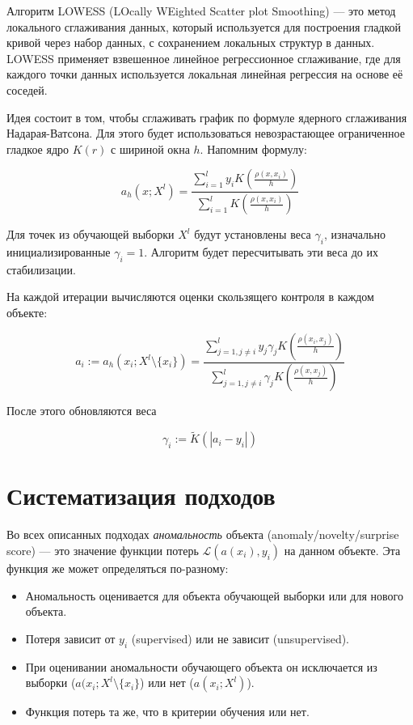 Алгоритм LOWESS (LOcally WEighted Scatter plot Smoothing) — это метод локального сглаживания данных, который используется для построения гладкой кривой через набор данных, с сохранением локальных структур в данных. LOWESS применяет взвешенное линейное регрессионное сглаживание, где для каждого точки данных используется локальная линейная регрессия на основе её соседей.

Идея состоит в том, чтобы сглаживать график по формуле ядерного сглаживания Надарая-Ватсона. Для этого будет использоваться невозрастающее ограниченное гладкое ядро $K(r)$ с шириной окна $h$. Напомним формулу:

$$a_h(x; X^l) = \frac{\sum_{i=1}^ly_i K(\frac{\rho(x, x_i)}{h})}{\sum_{i=1}^l K(\frac{\rho(x, x_i)}{h})}$$

Для точек из обучающей выборки $X^l$ будут установлены веса $\gamma_i$, изначально инициализированные $\gamma_i=1$. Алгоритм будет пересчитывать эти веса до их стабилизации.

На каждой итерации вычисляются оценки скользящего контроля в каждом объекте:

$$a_i := a_h(x_i;X^l\setminus \{x_i\}) = \frac{\sum_{j=1, j \neq i}^l y_j \gamma_j K(\frac{\rho(x_i, x_j)}{h})}{\sum_{j=1, j \neq i}^l \gamma_j K(\frac{\rho(x, x_j)}{h})}$$

После этого обновляются веса

$$\gamma_i := \tilde{K}(|a_i - y_i|)$$

\section{Систематизация подходов}

Во всех описанных подходах \textit{аномальность} объекта (anomaly/novelty/surprise score) --- это значение функции потерь $\mathcal{L}(a(x_i), y_i)$ на данном объекте. Эта функция же может определяться по-разному:

\begin{itemize}
    \item Аномальность оценивается для объекта обучающей выборки или для нового объекта.
    \item Потеря зависит от $y_i$ (supervised) или не зависит (unsupervised).
    \item При оценивании аномальности обучающего объекта он исключается из выборки ($a(x_i;X^l \setminus \{x_i\}$)  или нет ($a(x_i;X^l)$).
    \item Функция потерь та же, что в критерии обучения или нет.
\end{itemize}

